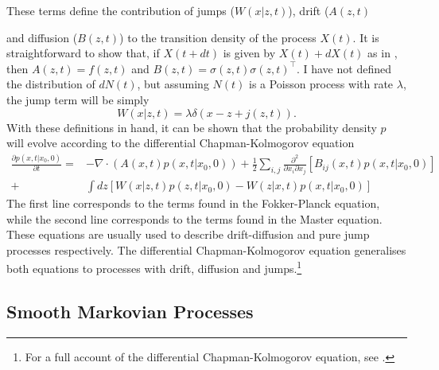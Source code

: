 These terms define the contribution of jumps ($W(x|z,t)$), drift ($A(z,t)${ and diffusion ($B(z,t)$) to the transition density of the process $X(t)$. It is straightforward to show that, if $X(t+dt)$ is given by $X(t) + dX(t)$ as in , then $A(z,t) = f(z,t)$ and
$B(z,t) = \sigma(z,t)\sigma(z,t)^\top$. I have not defined the distribution of $dN(t)$, but assuming $N(t)$ is a Poisson process with rate $\lambda$, the jump term will be simply $$W(x|z,t) = \lambda \delta(x-z+j(z,t)).$$ With these definitions in hand, it can be shown that the probability density $p$ will evolve according to the differential Chapman-Kolmogorov equation
\begin{align}
\frac{\partial p(x,t|x_0,0)}{\partial t}=& -\nabla \cdot \left(A(x,t) p(x,t|x_0,0)\right) + \frac{1}{2}\sum_{i,j} \frac{\partial^2}{\partial x_i \partial x_j} \left[B_{ij}(x,t) p(x,t|x_0,0)\right]\nonumber\\
+&\int dz \left[W(x|z,t) p(z,t|x_0,0) - W(z|x,t) p(x,t|x_0,0)\right]
\end{align}
The first line corresponds to the terms found in the Fokker-Planck equation, while the second line corresponds to the terms found in the Master equation. These equations are usually
used to describe drift-diffusion and pure jump processes respectively. The differential Chapman-Kolmogorov equation generalises both equations to processes with drift, diffusion
and jumps.\footnote{For a full account of the differential Chapman-Kolmogorov equation, see .}

\subsection{Smooth Markovian Processes}

}
